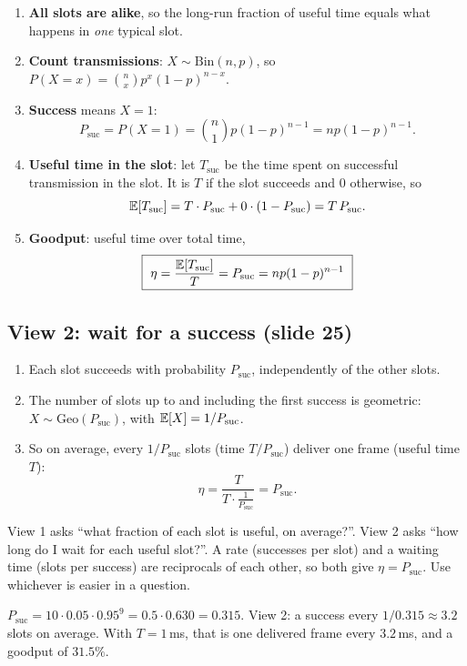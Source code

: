\begin{enumerate}
  \item \textbf{All slots are alike}, so the long-run fraction of useful time equals what happens in \emph{one} typical slot.
  \item \textbf{Count transmissions}: $X\sim\text{Bin}(n,p)$, so $P(X=x) = \binom nx p^x(1-p)^{n-x}$.
  \item \textbf{Success} means $X=1$:
        \[ P_{\text{suc}} = P(X=1) = \binom n1 p(1-p)^{n-1} = np(1-p)^{n-1}. \]
  \item \textbf{Useful time in the slot}: let $T_{\text{suc}}$ be the time spent on successful transmission in the slot. It is $T$ if the slot succeeds and $0$ otherwise, so
        \[ \mathbb{E}[T_{\text{suc}}] = T\cdot P_{\text{suc}} + 0\cdot(1-P_{\text{suc}}) = T\,P_{\text{suc}}. \]
  \item \textbf{Goodput}: useful time over total time,
        \[ \boxed{\ \eta = \frac{\mathbb{E}[T_{\text{suc}}]}{T} = P_{\text{suc}} = np(1-p)^{n-1}\ } \]
\end{enumerate}

\subsection{View 2: wait for a success (slide 25)}

\begin{enumerate}
  \item Each slot succeeds with probability $P_{\text{suc}}$, independently of the other slots.
  \item The number of slots up to and including the first success is geometric: $X\sim\text{Geo}(P_{\text{suc}})$, with $\mathbb{E}[X] = 1/P_{\text{suc}}$.
  \item So on average, every $1/P_{\text{suc}}$ slots (time $T/P_{\text{suc}}$) deliver one frame (useful time $T$):
        \[ \eta = \frac{T}{T\cdot\frac{1}{P_{\text{suc}}}} = P_{\text{suc}}. \]
\end{enumerate}

\begin{intuition}
View 1 asks ``what fraction of each slot is useful, on average?''. View 2 asks ``how long do I wait for each useful slot?''. A rate (successes per slot) and a waiting time
(slots per success) are reciprocals of each other, so both give $\eta = P_{\text{suc}}$. Use whichever is easier in a question.
\end{intuition}

\begin{example}[$n=10$ nodes, $p = 0.05$]
$P_{\text{suc}} = 10\cdot0.05\cdot0.95^9 = 0.5\cdot0.630 = 0.315$. View 2: a success every $1/0.315\approx3.2$ slots on average. With $T=1$\,ms, that is one delivered frame every $3.2$\,ms, and a goodput of $31.5\%$.
\end{example}

